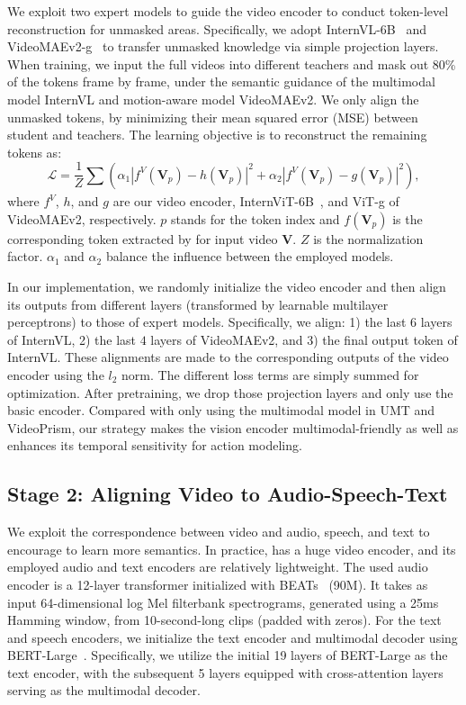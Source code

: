 We exploit two expert models to guide the video encoder to conduct token-level reconstruction for unmasked areas.
Specifically, we adopt InternVL-6B~\cite{chen2023internvl} and VideoMAEv2-g~\cite{wang2023videomae} to transfer unmasked knowledge via simple projection layers. 
When training, we input the full videos into different teachers and mask out 80\% of the tokens frame by frame, under the semantic guidance of the multimodal model InternVL and motion-aware model VideoMAEv2. We only align the unmasked tokens, by minimizing their mean squared error (MSE) between student and teachers. The learning objective is to reconstruct the remaining tokens as:
\begin{equation}
    \mathcal{L} = \frac{1}{Z}\sum_{}{(\alpha_1|f^V(\mathbf{V}_p)-h(\mathbf{V}_p)|^2+\alpha_2|f^V(\mathbf{V}_p)-g(\mathbf{V}_p)|^2)},
\end{equation}
where $f^V$, $h$, and $g$ are our video encoder, InternViT-6B~\cite{chen2023internvl}, and ViT-g of VideoMAEv2, respectively. $p$ stands for the token index and $f(\mathbf{V}_p)$ is the corresponding token extracted by {\modelname} for input video $\mathbf{V}$. $Z$ is the normalization factor. $\alpha_1$ and $\alpha_2$ balance the influence between the employed models.

In our implementation, we randomly initialize the video encoder and then align its outputs from different layers (transformed by learnable multilayer perceptrons) to those of expert models. Specifically, we align: 1) the last $6$ layers of InternVL, 2) the last $4$ layers of VideoMAEv2, and 3) the final output token of InternVL. These alignments are made to the corresponding outputs of the video encoder using the $l_2$ norm. The different loss terms are simply summed for optimization. After pretraining, we drop those projection layers and only use the basic encoder. Compared with only using the multimodal model in UMT and VideoPrism, our strategy makes the vision encoder multimodal-friendly as well as enhances its temporal sensitivity for action modeling.


\subsection{Stage 2: Aligning Video to Audio-Speech-Text}

We exploit the correspondence between video and audio, speech, and text to encourage {\modelname} to learn more semantics. 
In practice, {\modelname} has a huge video encoder, and its employed audio and text encoders are relatively lightweight. The used audio encoder is a 12-layer transformer initialized with BEATs~\cite{beats} (90M). It takes as input 64-dimensional log Mel filterbank spectrograms, generated using a 25ms Hamming window, from 10-second-long clips (padded with zeros).
For the text and speech encoders, we initialize the text encoder and multimodal decoder using BERT-Large~\cite{devlin2018bert}. Specifically, we utilize the initial 19 layers of BERT-Large as the text encoder, with the subsequent 5 layers equipped with cross-attention layers serving as the multimodal decoder.

